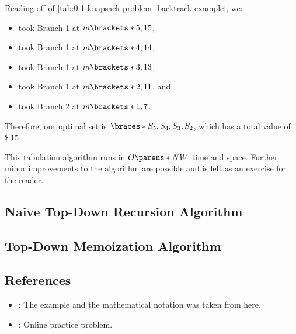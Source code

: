 Reading off of \cref{tab:0-1-knapsack-problem--backtrack-example}, we:
\begin{itemize}
    \item took Branch 1 at $m \brackets*{5, 15}$,
    \item took Branch 1 at $m \brackets*{4, 14}$,
    \item took Branch 1 at $m \brackets*{3, 13}$,
    \item took Branch 1 at $m \brackets*{2, 11}$, and
    \item took Branch 2 at $m \brackets*{1, 7}$.
\end{itemize}

Therefore, our optimal set is $\braces*{S_5, S_4, S_3, S_2}$, which has a total value of $\SI{15}[\$]{}$.

This tabulation algorithm runs in $O\parens*{NW}$ time and space. Further minor improvements to the algorithm are possible and is left as an exercise for the reader.


\subsection{Naive Top-Down Recursion Algorithm}



\subsection{Top-Down Memoization Algorithm}



\subsection{References}
\begin{itemize}
    \item \href{https://en.wikipedia.org/wiki/Knapsack_problem}{}: The example and the mathematical notation was taken from here.
    \item \href{https://practice.geeksforgeeks.org/problems/0-1-knapsack-problem0945/1}{}: Online practice problem.%
\end{itemize}


